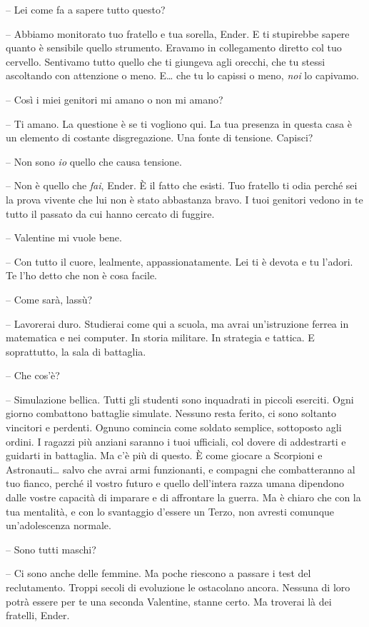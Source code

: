 {-- Lei come fa a sapere tutto questo?}

{-- Abbiamo monitorato tuo fratello e tua sorella, Ender. E ti
	stupirebbe sapere quanto è sensibile quello strumento. Eravamo in
	collegamento diretto col tuo cervello. Sentivamo tutto quello che ti
	giungeva agli orecchi, che tu stessi ascoltando con attenzione o meno.
	E\ldots{} che tu lo capissi o meno, \emph{noi} lo capivamo.}

{-- Così i miei genitori mi amano o non mi amano?}

{-- Ti amano. La questione è se ti vogliono qui. La tua presenza in
	questa casa è un elemento di costante disgregazione. Una fonte di
	tensione. Capisci?}

{-- Non sono \emph{io} quello che causa tensione.}

{-- Non è quello che \emph{fai}, \emph{} Ender. È il fatto che esisti.
	Tuo fratello ti odia perché sei la prova vivente che lui non è stato
	abbastanza bravo. I tuoi genitori vedono in te tutto il passato da cui
	hanno cercato di fuggire.}

{-- Valentine mi vuole bene.}

{-- Con tutto il cuore, lealmente, appassionatamente. Lei ti è devota e
	tu l'adori. Te l'ho detto che non è cosa facile.}

{-- Come sarà, lassù?}

{-- Lavorerai duro. Studierai come qui a scuola, ma avrai un'istruzione
	ferrea in matematica e nei computer. In storia militare. In strategia e
	tattica. E soprattutto, la sala di battaglia.}

{-- Che cos'è?}

{-- Simulazione bellica. Tutti gli studenti sono inquadrati in piccoli
	eserciti. Ogni giorno combattono battaglie simulate. Nessuno resta
	ferito, ci sono soltanto vincitori e perdenti. Ognuno comincia come
	soldato semplice, sottoposto agli ordini. I ragazzi più anziani saranno
	i tuoi ufficiali, col dovere di addestrarti e guidarti in battaglia. Ma
	c'è più di questo. È come giocare a Scorpioni e Astronauti\ldots{} salvo
	che avrai armi funzionanti, e compagni che combatteranno al tuo fianco,
	perché il vostro futuro e quello dell'intera razza umana dipendono dalle
	vostre capacità di imparare e di affrontare la guerra. Ma è chiaro che
	con la tua mentalità, e con lo svantaggio d'essere un Terzo, non avresti
	comunque un'adolescenza normale.}

{-- Sono tutti maschi?}

{-- Ci sono anche delle femmine. Ma poche riescono a passare i test del
	reclutamento. Troppi secoli di evoluzione le ostacolano ancora. Nessuna
	di loro potrà essere per te una seconda Valentine, stanne certo. Ma
	troverai là dei fratelli, Ender.}

